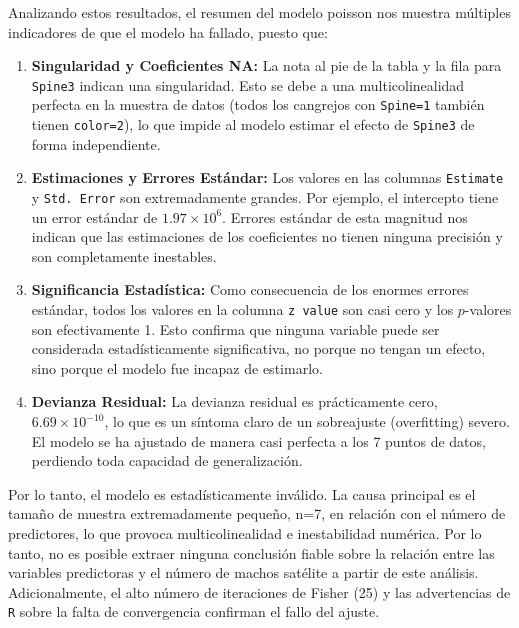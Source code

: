 Analizando estos resultados, el resumen del modelo poisson nos muestra múltiples indicadores de que el modelo ha fallado, puesto que:

\begin{enumerate}
    \item \textbf{Singularidad y Coeficientes NA:} La nota al pie de la tabla y la fila para \texttt{Spine3} indican una singularidad. Esto se debe a una multicolinealidad perfecta en la muestra de datos (todos los cangrejos con \texttt{Spine=1} también tienen \texttt{color=2}), lo que impide al modelo estimar el efecto de \texttt{Spine3} de forma independiente.

    \item \textbf{Estimaciones y Errores Estándar:} Los valores en las columnas \texttt{Estimate} y \texttt{Std. Error} son extremadamente grandes. Por ejemplo, el intercepto tiene un error estándar de $1.97 \times 10^6$. Errores estándar de esta magnitud nos indican que las estimaciones de los coeficientes no tienen ninguna precisión y son completamente inestables.

    \item \textbf{Significancia Estadística:} Como consecuencia de los enormes errores estándar, todos los valores en la columna \texttt{z value} son casi cero y los $p$-valores son efectivamente 1. Esto confirma que ninguna variable puede ser considerada estadísticamente significativa, no porque no tengan un efecto, sino porque el modelo fue incapaz de estimarlo.

    \item \textbf{Devianza Residual:} La devianza residual es prácticamente cero, $6.69 \times 10^{-10}$, lo que es un síntoma claro de un sobreajuste (overfitting) severo. El modelo se ha ajustado de manera casi perfecta a los 7 puntos de datos, perdiendo toda capacidad de generalización.
\end{enumerate}

\begin{tcolorbox}
Por lo tanto, el modelo es estadísticamente inválido. La causa principal es el tamaño de muestra extremadamente pequeño, n=7, en relación con el número de predictores, lo que provoca multicolinealidad e inestabilidad numérica. Por lo tanto, no es posible extraer ninguna conclusión fiable sobre la relación entre las variables predictoras y el número de machos satélite a partir de este análisis. Adicionalmente, el alto número de iteraciones de Fisher (25) y las advertencias de \texttt{R} sobre la falta de convergencia confirman el fallo del ajuste.
\end{tcolorbox}

